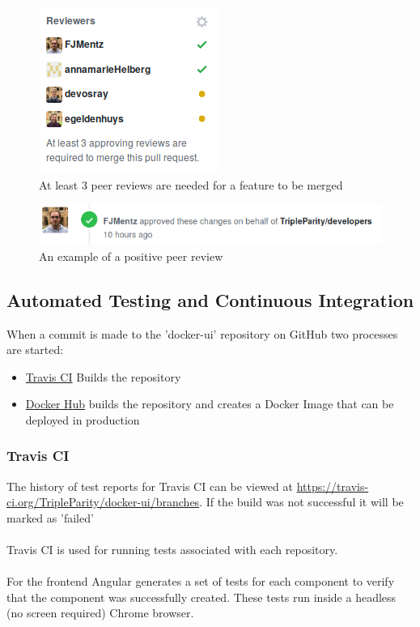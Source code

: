 \documentclass[]{article}
\begin{document}
\begin{figure}[H]
	\centering
	\includegraphics[scale=0.5]{github_3_reviews_required.png}
	\caption{At least 3 peer reviews are needed for a feature to be merged}
\end{figure}

\begin{figure}[H]
	\centering
	\includegraphics[scale=0.5]{github_approved_review.png}
	\caption{An example of a positive peer review}
\end{figure}

\subsection{Automated Testing and Continuous Integration}
When a commit is made to the 'docker-ui' repository on GitHub two
processes are started:
\begin{itemize}
	\item \href{https://travis-ci.org/TripleParity/docker-ui/branches}{Travis CI} Builds the repository
	\item \href{https://hub.docker.com/r/tripleparity/docker-ui/builds/}{Docker Hub} builds the repository and creates a Docker Image that can be deployed in production
\end{itemize}

\subsubsection{Travis CI}
The history of test reports for Travis CI can be viewed at \url{https://travis-ci.org/TripleParity/docker-ui/branches}.
If the build was not successful it will be marked as 'failed' \\
\\
Travis CI is used for running tests associated with each repository. \\
\\
For the frontend Angular generates a set of tests for each component to verify
that the component was successfully created. These tests run inside a
headless (no screen required) Chrome browser.
\end{document}
